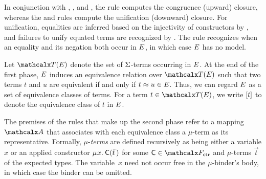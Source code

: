 
In conjunction with , , and , the  rule computes the congruence (upward) closure,
whereas the  and  rules %
compute the unification (downward) closure.
For unification, %
equalities are inferred based on the injectivity of constructors by ,
and failures to unify equated terms are recognized by .
The  rule recognizes when an equality and its negation both occur in $E$, in which case $E$ has no model.

Let $\tEc$ denote the set of $\mathrm{\Sigma}$-terms occurring in $E$.
At the end of the first phase, $E$ induces an equivalence
relation over $\tEc$ such that two terms $t$ and $u$ are equivalent if and
only if $t \approx u \in E$.
Thus, we can regard $E$ as a set of
equivalence classes of terms. For a term $t \in \tEc$, we write $[t]$ to
denote the equivalence class of $t$ in $E$.

The premises of the rules that make up the second phase refer to a mapping $\Val$
that associates with each equivalence class a $\mu$-term as its representative.
%
Formally, $\mu$-\emph{terms} are defined recursively as being either a variable $x$
or an applied constructor
$\MU x.\: \const{C}( \vec t\, )$ for some $\const{C} \in \Ctr$ and
$\mu$-terms $\vec t$ of the expected types.
The variable~$x$ need not occur free in the $\mu$-binder's body, in which case
the binder can be omitted.

